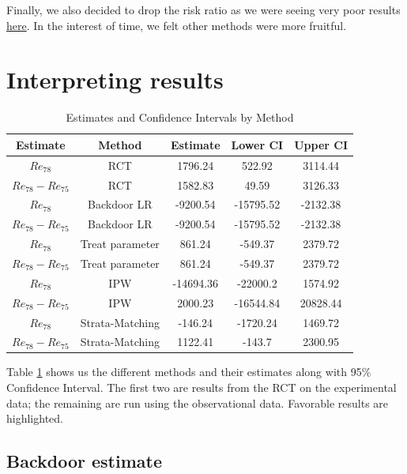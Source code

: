 \documentclass[12pt]{article}
\begin{document}
Finally, we also decided to drop the risk ratio as we were seeing very poor results \href{https://github.com/cs396s24/Proj-Job-Training/blob/main/backdoor/3_bd_u78.ipynb}{here}. In the interest of time, we felt other methods were more fruitful.

\section{Interpreting results}

\begin{table}[h]
\centering
\begin{tabular}{|c|c|c|c|c|}
\hline
\textbf{Estimate} & \textbf{Method} & \textbf{Estimate} & \textbf{Lower CI} & \textbf{Upper CI} \\
\hline
$Re_{78}$ & RCT & 1796.24 & 522.92 & 3114.44 \\
$Re_{78} - Re_{75}$ & RCT & 1582.83 & 49.59 & 3126.33 \\
$Re_{78}$ & Backdoor LR & -9200.54 & -15795.52 & -2132.38 \\
$Re_{78} - Re_{75}$ & Backdoor LR & -9200.54 & -15795.52 & -2132.38 \\
\rowcolor{lightgray} $Re_{78}$ & Treat parameter & 861.24 & -549.37 & 2379.72 \\
\rowcolor{lightgray} $Re_{78} - Re_{75}$ & Treat parameter & 861.24 & -549.37 & 2379.72 \\
$Re_{78}$ & IPW & -14694.36 & -22000.2 & 1574.92 \\
\rowcolor{lightgray} $Re_{78} - Re_{75}$ & IPW & 2000.23 & -16544.84 & 20828.44 \\
$Re_{78}$ & Strata-Matching & -146.24 & -1720.24 & 1469.72 \\
\rowcolor{lightgray} $Re_{78} - Re_{75}$ & Strata-Matching & 1122.41 & -143.7 & 2300.95 \\
\hline
\end{tabular}
\caption{Estimates and Confidence Intervals by Method}
\label{tab:estimates_ci}
\end{table}

Table \ref{tab:estimates_ci} shows us the different methods and their estimates along with 95\% Confidence Interval. The first two are results from the RCT on the experimental data; the remaining are run using the observational data. Favorable results are highlighted.

\subsection{Backdoor estimate}
\end{document}
